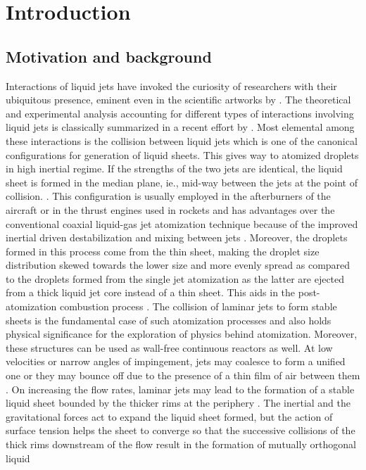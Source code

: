 \newcommand{\keyword}[1]{\textbf{#1}}
\newcommand{\tabhead}[1]{\textbf{#1}}
\newcommand{\code}[1]{\texttt{#1}}
\newcommand{\file}[1]{\texttt{\bfseries#1}}
\newcommand{\option}[1]{\texttt{\itshape#1}}
\chapter{Introduction}
\section{Motivation and background}
Interactions of liquid jets have invoked the curiosity of researchers with their ubiquitous presence, eminent even in the scientific artworks by \cite{da1954notebooks}. The theoretical and experimental analysis accounting for different types of interactions involving liquid jets is classically summarized in a recent effort by \cite{eggers2008physics}. Most elemental among these interactions is the collision between liquid jets which is one of the canonical configurations for generation of liquid sheets. This gives way to atomized droplets in high inertial regime. If the strengths of the two jets are identical, the liquid sheet is formed in the median plane, ie., mid-way between the jets at the point of collision.  \citep{bush2004collision}. This configuration is usually employed in the afterburners of the aircraft or in the thrust engines used in rockets \citep{chen2013high} and has advantages over the conventional coaxial liquid-gas jet atomization technique because of the improved inertial driven destabilization and mixing between jets \citep{erni2013free}. Moreover, the droplets formed in this process come from the thin sheet, making the droplet size distribution skewed towards the lower size and more evenly spread \citep{inoue2008study,inoue2009liquid} as compared to the droplets formed from the single jet atomization as the latter are ejected from a thick liquid jet core instead of a thin sheet. This aids in the post-atomization combustion process \citep{lhuissier2011destabilization}. The collision of laminar jets to form stable sheets is the fundamental case of such atomization processes and also holds physical significance for the exploration of physics behind atomization. Moreover, these structures can be used as wall-free continuous reactors \citep{erni2013free} as well. At low velocities or narrow angles of impingement, jets may coalesce to form a unified one or they may bounce off due to the presence of a thin film of air between them \citep{wadhwa2013noncoalescence}. On increasing the flow rates, laminar jets may lead to the formation of a stable liquid sheet bounded by the thicker rims at the periphery \citep{yang2014liquid}. The inertial and the gravitational forces act to expand the liquid sheet formed, but the action of surface tension helps the sheet to converge so that the successive collisions of the thick rims downstream of the flow result in the formation of mutually orthogonal liquid 